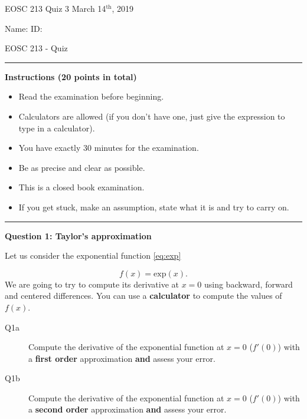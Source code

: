 \documentclass{article}
\begin{document}
\pagestyle{empty}

\large{EOSC 213 Quiz 3} \hspace{10cm} \large{March 14$^{\textrm{th}}$, 2019}

\large{Name:} \hspace{12cm} \large{ID: }
\begin{center}
\Huge{EOSC 213 - Quiz}
\end{center}

\rule{\textwidth}{1pt}

\large{\textbf{Instructions (20 points in total)}}
\begin{multicols}{2}
\begin{itemize}
\item Read the examination before beginning.
\item Calculators are allowed (if you don't have one, just give the expression to type in a calculator).
\item You have exactly 30 minutes for the examination.
\item Be as precise and clear as possible.
\item This is a closed book examination.
\item If you get stuck, make an assumption, state what it is and try to carry on.
\end{itemize} 
\end{multicols}


\rule{\textwidth}{1pt}

\textbf{Question 1: Taylor's approximation}

Let us consider the exponential function \ref{eq:exp}

\begin{equation}
f(x) = \mathrm{exp}(x). \label{eq:exp}
\end{equation} We are going to try to compute its derivative at $x = 0$ using backward, forward and centered differences. You can use a \textbf{calculator} to compute the values of $f(x)$.


\begin{description}
\item [Q1a] Compute the derivative of the exponential function at $x = 0$ ($f'(0)$) with a \textbf{first order} approximation \textbf{and} assess your error. 
\vspace{3cm}
\item [Q1b] Compute the derivative of the exponential function at $x = 0$ ($f'(0)$) with a \textbf{second order} approximation \textbf{and} assess your error. 
\vspace{3cm}

\end{description}
\end{document}
